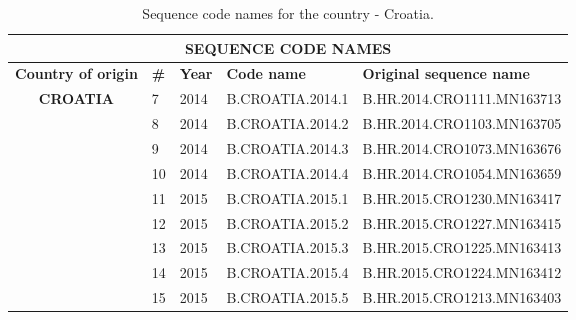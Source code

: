 \begin{table}[htbp]
 \caption{Sequence code names for the country - Croatia.}
    \centering
\begin{tabular}{|cllll|}
\hline
\multicolumn{5}{|c|}{\textbf{SEQUENCE   CODE NAMES}}                                                                                                                                                        \\ \hline
\multicolumn{1}{|l|}{\textbf{Country   of origin}}      & \multicolumn{1}{l|}{\textbf{\#}} & \multicolumn{1}{r|}{\textbf{Year}} & \multicolumn{1}{l|}{\textbf{Code name}} & \textbf{Original sequence name} \\ \hline
\multicolumn{1}{|c|}{\multirow{9}{*}{\textbf{CROATIA}}} & \multicolumn{1}{l|}{7}           & \multicolumn{1}{l|}{2014}          & \multicolumn{1}{l|}{B.CROATIA.2014.1}   & B.HR.2014.CRO1111.MN163713      \\ \cline{2-5} 
\multicolumn{1}{|c|}{}                                  & \multicolumn{1}{l|}{8}           & \multicolumn{1}{l|}{2014}          & \multicolumn{1}{l|}{B.CROATIA.2014.2}   & B.HR.2014.CRO1103.MN163705      \\ \cline{2-5} 
\multicolumn{1}{|c|}{}                                  & \multicolumn{1}{l|}{9}           & \multicolumn{1}{l|}{2014}          & \multicolumn{1}{l|}{B.CROATIA.2014.3}   & B.HR.2014.CRO1073.MN163676      \\ \cline{2-5} 
\multicolumn{1}{|c|}{}                                  & \multicolumn{1}{l|}{10}          & \multicolumn{1}{l|}{2014}          & \multicolumn{1}{l|}{B.CROATIA.2014.4}   & B.HR.2014.CRO1054.MN163659      \\ \cline{2-5} 
\multicolumn{1}{|c|}{}                                  & \multicolumn{1}{l|}{11}          & \multicolumn{1}{l|}{2015}          & \multicolumn{1}{l|}{B.CROATIA.2015.1}   & B.HR.2015.CRO1230.MN163417      \\ \cline{2-5} 
\multicolumn{1}{|c|}{}                                  & \multicolumn{1}{l|}{12}          & \multicolumn{1}{l|}{2015}          & \multicolumn{1}{l|}{B.CROATIA.2015.2}   & B.HR.2015.CRO1227.MN163415      \\ \cline{2-5} 
\multicolumn{1}{|c|}{}                                  & \multicolumn{1}{l|}{13}          & \multicolumn{1}{l|}{2015}          & \multicolumn{1}{l|}{B.CROATIA.2015.3}   & B.HR.2015.CRO1225.MN163413      \\ \cline{2-5} 
\multicolumn{1}{|c|}{}                                  & \multicolumn{1}{l|}{14}          & \multicolumn{1}{l|}{2015}          & \multicolumn{1}{l|}{B.CROATIA.2015.4}   & B.HR.2015.CRO1224.MN163412      \\ \cline{2-5} 
\multicolumn{1}{|c|}{}                                  & \multicolumn{1}{l|}{15}          & \multicolumn{1}{l|}{2015}          & \multicolumn{1}{l|}{B.CROATIA.2015.5}   & B.HR.2015.CRO1213.MN163403      \\ \hline
\end{tabular}
\end{table}


